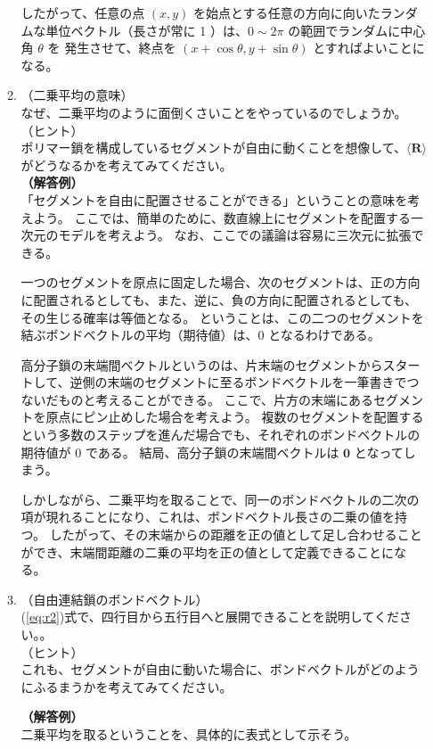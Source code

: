 \documentclass[uplatex,dvipdfmx,a4paper,11pt, titlepage]{jsarticle}
\begin{document}
\begin{itemize}
\begin{enumerate}
	したがって、任意の点 $(x,y)$ を始点とする任意の方向に向いたランダムな単位ベクトル（長さが常に 1 ）は、$0 \sim 2\pi$ の範囲でランダムに中心角 $\theta$ を
	発生させて、終点を $(x+\cos \theta, y+\sin \theta)$ とすればよいことになる。


	\item
	（二乗平均の意味）\\
	なぜ、二乗平均のように面倒くさいことをやっているのでしょうか。\\
	（ヒント）\\
	ポリマー鎖を構成しているセグメントが自由に動くことを想像して、$\langle \bm{R} \rangle$ がどうなるかを考えてみてください。\\
	{\bf（解答例）}\\
	「セグメントを自由に配置させることができる」ということの意味を考えよう。
	ここでは、簡単のために、数直線上にセグメントを配置する一次元のモデルを考えよう。
	なお、ここでの議論は容易に三次元に拡張できる。

	一つのセグメントを原点に固定した場合、次のセグメントは、正の方向に配置されるとしても、また、逆に、負の方向に配置されるとしても、その生じる確率は等価となる。
	ということは、この二つのセグメントを結ぶボンドベクトルの平均（期待値）は、0 となるわけである。

	高分子鎖の末端間ベクトルというのは、片末端のセグメントからスタートして、逆側の末端のセグメントに至るボンドベクトルを一筆書きでつないだものと考えることができる。
	ここで、片方の末端にあるセグメントを原点にピン止めした場合を考えよう。
	複数のセグメントを配置するという多数のステップを進んだ場合でも、それぞれのボンドベクトルの期待値が 0 である。
	結局、高分子鎖の末端間ベクトルは ${\bm 0}$ となってしまう。

	しかしながら、二乗平均を取ることで、同一のボンドベクトルの二次の項が現れることになり、これは、ボンドベクトル長さの二乗の値を持つ。
	したがって、その末端からの距離を正の値として足し合わせることができ、末端間距離の二乗の平均を正の値として定義できることになる。

	\item
	（自由連結鎖のボンドベクトル）\\
	(\ref{eq:r2})式で、四行目から五行目へと展開できることを説明してください。。\\
	（ヒント）\\
	これも、セグメントが自由に動いた場合に、ボンドベクトルがどのようにふるまうかを考えてみてください。

	{\bf（解答例）}\\
	二乗平均を取るということを、具体的に表式として示そう。


\end{enumerate}
\end{itemize}
\end{document}
